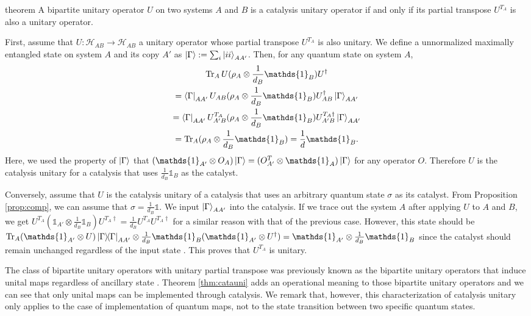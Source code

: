 \documentclass[aps, reprint, amsmath,amssymb, prx, superscriptaddress]{revtex4-2}
\begin{document}
\begin{theoremEnd}{theorem} \label{thm:catauni}
    A bipartite unitary operator $U$ on two systems $A$ and $B$ is a catalysis unitary operator if and only if its partial transpose $U^{T_A}$ is also a unitary operator.
\end{theoremEnd}
\begin{proofEnd}
    First, assume that $U:\mathcal{H}_{AB}\to\mathcal{H}_{AB}$ a unitary operator whose partial transpose $U^{T_A}$ is also unitary. We define a unnormalized maximally entangled  state on system $A$ and its copy $A'$ as $\ket{\Gamma}:=\sum_i \ket{ii}_{AA'}$. Then, for any quantum state on system $A$,
    \begin{gather}
        \Tr_A U(\rho_A \otimes \frac{1}{d_B}\mathds{1}_B)U^\dag\\
        =\bra{\Gamma}_{AA'} U_{AB}(\rho_A \otimes \frac{1}{d_B}\mathds{1}_B)U_{AB}^\dag \ket{\Gamma}_{AA'}\\
        =\bra{\Gamma}_{AA'}  U_{A'B}^{T_A} (\rho_A \otimes \frac{1}{d_B}\mathds{1}_B)U_{A'B}^{T_A\dag}\ket{\Gamma}_{AA'}\\
        =\Tr_A(\rho_A\otimes\frac{1}{d_B}\mathds{1}_B)=\frac{1}{d}\mathds{1}_B.
    \end{gather}
     Here, we used the property of $\ket{\Gamma}$ that $(\mathds{1}_{A'}\otimes O_A)\ket{\Gamma}=(O_{A'}^T\otimes\mathds{1}_A)\ket{\Gamma}$ for any operator $O$. Therefore $U$ is the catalysis unitary for a catalysis that uses $\frac{1}{d_B}\mathds{1}_B$ as the catalyst.
    
    Conversely, assume that $U$ is the catalysis unitary of a catalysis that uses an arbitrary quantum state $\sigma$ as its catalyst. From Proposition \ref{prop:comp}, we can assume that $\sigma=\frac{1}{d_B}\mathds{1}$. We input $\ket{\Gamma}_{AA'}$ into the catalysis. If we trace out the system $A$ after applying $U$ to $A$ and $B$, we get $U^{T_A}(\mathds{1}_{A'} \otimes \frac{1}{d_B}\mathds{1}_B)U^{T_A\dag}=\frac{1}{d_B} U^{T_A}U^{T_A\dag}$ for a similar reason with that of the previous case. However, this state should be $\Tr_A(\mathds{1}_{A'}\otimes U)\dyad{\Gamma}_{AA'}\otimes \frac{1}{d_B}\mathds{1}_B(\mathds{1}_{A'}\otimes U^\dag)=\mathds{1}_{A'}\otimes\frac{1}{d_B}\mathds{1}_B$ since the catalyst should remain unchanged regardless of the input state \cite{lie2019unconditionally}. This proves that $U^{T_A}$ is unitary.
\end{proofEnd}
The class of bipartite unitary operators with unitary partial transpose was previously known as the bipartite unitary operators that induce unital maps regardless of ancillary state \cite{deschamps2016some, benoist2017bipartite}. Theorem \ref{thm:catauni} adds an operational meaning to those bipartite unitary operators and we can see that only unital maps can be implemented through catalysis. We remark that, however, this characterization of catalysis unitary only applies to the case of implementation of quantum maps, not to the state transition between two specific quantum states.
\end{document}

